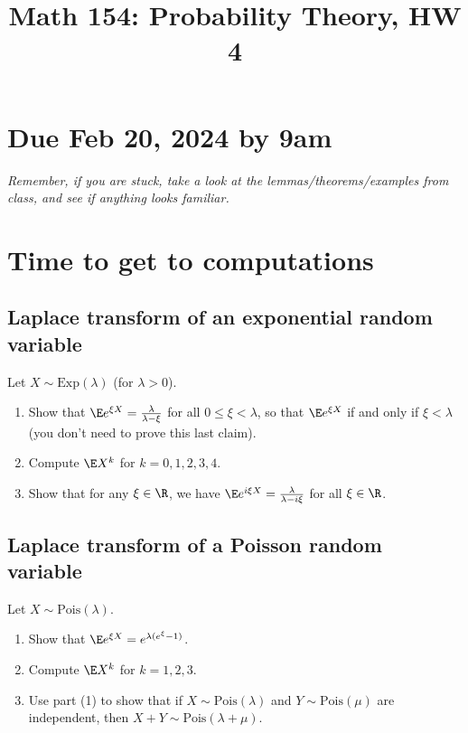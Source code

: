\documentclass[12pt,reqno]{amsart}
\title{\Large Math 154: Probability Theory, HW 4\vspace{-0.1cm}}
\theoremstyle{definition}
\theoremstyle{remark}
\numberwithin{equation}{section}
\newenvironment{nouppercase}{%
  \let\uppercase\relax%
  \renewcommand{\uppercasenonmath}[1]{}}{}
\begin{document}
\begin{nouppercase}
\maketitle
\end{nouppercase}
\section*{Due Feb 20, 2024 by 9am}
\emph{Remember, if you are stuck, take a look at the lemmas/theorems/examples from class, and see if anything looks familiar.}
\section{Time to get to computations}
\subsection{Laplace transform of an exponential random variable}
Let $X\sim\mathrm{Exp}(\lambda)$ (for $\lambda>0$). 
\begin{enumerate}
\item Show that $\E e^{\xi X}=\frac{\lambda}{\lambda-\xi}$ for all $0\leq\xi<\lambda$, so that $\E e^{\xi X}$ if and only if $\xi<\lambda$ (you don't need to prove this last claim).
\item Compute $\E X^{k}$ for $k=0,1,2,3,4$.
\item Show that for any $\xi\in\R$, we have $\E e^{i\xi X}=\frac{\lambda}{\lambda-i\xi}$ for all $\xi\in\R$.
\end{enumerate}
\subsection{Laplace transform of a Poisson random variable}
Let $X\sim \mathrm{Pois}(\lambda)$.
\begin{enumerate}
\item Show that $\E e^{\xi X}=e^{\lambda(e^{\xi}-1)}$.
\item Compute $\E X^{k}$ for $k=1,2,3$.
\item Use part (1) to show that if $X\sim\mathrm{Pois}(\lambda)$ and $Y\sim\mathrm{Pois}(\mu)$ are independent, then $X+Y\sim\mathrm{Pois}(\lambda+\mu)$.
\end{enumerate}
\end{document}
